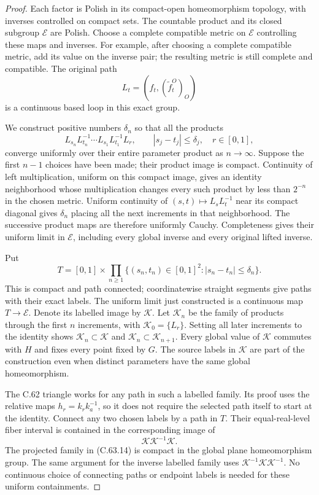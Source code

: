 \begin{proof}
Each factor is Polish in its compact-open
homeomorphism topology, with inverses controlled
on compact sets. The countable product and its
closed subgroup $\mathcal E$ are Polish. Choose
a complete compatible metric on $\mathcal E$
controlling these maps and inverses. For example,
after choosing a complete compatible metric,
add its value on the inverse pair; the resulting
metric is still complete and compatible.
The original path
\[
             L_t=(f_t,(\widetilde f_t^O)_O)
                                                               \tag{C.63.11}
\]
is a continuous based loop in this exact group.

We construct positive numbers $\delta_n$ so that
all the products
\[
 L_{s_n}L_{t_n}^{-1}\cdots
 L_{s_1}L_{t_1}^{-1}L_r,
       \qquad |s_j-t_j|\leq\delta_j,\quad r\in[0,1],
                                                               \tag{C.63.12}
\]
converge uniformly over their entire parameter
product as $n\to\infty$. Suppose the first $n-1$
choices have been made; their product image is
compact. Continuity of left multiplication,
uniform on this compact image, gives an identity
neighborhood whose multiplication changes every
such product by less than $2^{-n}$ in the chosen
metric. Uniform continuity of
$(s,t)\mapsto L_sL_t^{-1}$ near its compact
diagonal gives $\delta_n$ placing all the next
increments in that neighborhood. The successive
product maps are therefore uniformly Cauchy.
Completeness gives their uniform limit in
$\mathcal E$, including every global inverse
and every original lifted inverse.

Put
\[
 T=[0,1]\times\prod_{n\geq1}
       \{(s_n,t_n)\in[0,1]^2:|s_n-t_n|\leq\delta_n\}.
                                                               \tag{C.63.13}
\]
This is compact and path connected; coordinatewise
straight segments give paths with their exact
labels. The uniform limit just constructed is a
continuous map $T\to\mathcal E$. Denote its
labelled image by $\mathcal K$. Let $\mathcal K_n$
be the family of products through the first $n$
increments, with $\mathcal K_0=\{L_r\}$.
Setting all later increments to the identity
shows $\mathcal K_n\subset\mathcal K$ and
$\mathcal K_n\subset\mathcal K_{n+1}$.
Every global value of $\mathcal K$ commutes with
$H$ and fixes every point fixed by $G$.
The source labels in $\mathcal K$ are part of
the construction even when distinct parameters
have the same global homeomorphism.

The C.62 triangle works for any path in such a
labelled family. Its proof uses the relative
maps $h_r=k_rk_a^{-1}$, so it does not require
the selected path itself to start at the identity.
Connect any two chosen labels by a path in $T$.
Their equal-real-level fiber interval is contained
in the corresponding image of
\[
             \mathcal K\mathcal K^{-1}\mathcal K.
                                                               \tag{C.63.14}
\]
The projected family in (C.63.14) is compact in
the global plane homeomorphism group. The same
argument for the inverse labelled family uses
$\mathcal K^{-1}\mathcal K\mathcal K^{-1}$.
No continuous choice of connecting paths or
endpoint labels is needed for these uniform
containments.


\end{proof}
